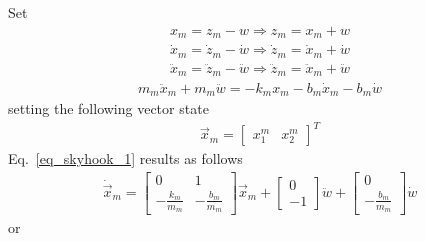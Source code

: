 \documentclass[11pt,a4paper,oneside]{book}
\numberwithin{equation}{section}
\theoremstyle{it}
\theoremstyle{definition}
\begin{document}
Set
\begin{equation*}
	\begin{aligned}
		x_m=z_m-w \Rightarrow z_m=x_m+w\\[6pt]
		\dot{x}_m=\dot{z}_m-\dot{w} \Rightarrow \dot{z}_m=\dot{x}_m+\dot{w} \\[6pt]
		\ddot{x}_m=\ddot{z}_m-\ddot{w} \Rightarrow \ddot{z}_m=\ddot{x}_m+\ddot{w}
	\end{aligned}
\end{equation*} 
\begin{equation}\label{eq_skyhook_1}
	\begin{aligned}
		m_m\ddot{x}_m + m_m\ddot{w}= -k_m x_m-b_m\dot{x}_m - b_m\dot{w}
	\end{aligned}
\end{equation} 
setting the following vector state
\begin{equation}
	\begin{aligned}
		\vec{x}_m = \begin{bmatrix} x_1^m & x_2^m \end{bmatrix}^T
	\end{aligned}
\end{equation} 
Eq.~\ref{eq_skyhook_1} results as follows
\begin{equation}
	\begin{aligned}
		\dot{\vec{x}}_m = \begin{bmatrix} 0 & 1 \\[6pt] -\frac{k_m}{m_m} & -\frac{b_m}{m_m} \end{bmatrix}{\vec{x}}_m+\begin{bmatrix} 0 \\[6pt] -1 \end{bmatrix}\ddot{w} + \begin{bmatrix} 0 \\[6pt] -\frac{b_m}{m_m} \end{bmatrix}\dot{w}
	\end{aligned}
\end{equation} 
or
\end{document}
